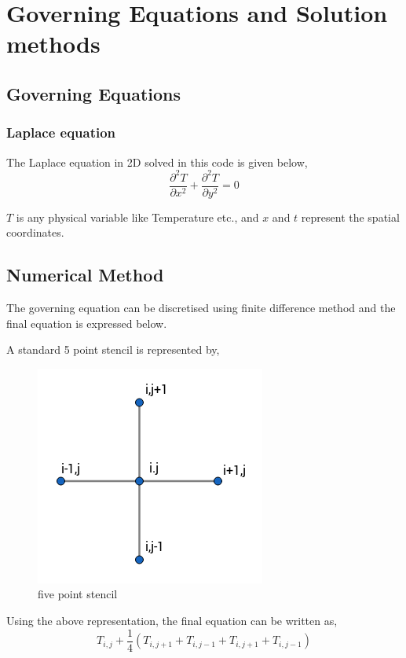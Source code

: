 
\chapter{Governing Equations and Solution methods}

\section{Governing Equations}
\subsection{Laplace equation}The Laplace equation in 2D solved in this code is given below,
\begin{equation}\label{eq:uhe}
 \frac{\partial^2 T}{\partial x^2}+\frac{\partial^2 T}{\partial y^2} = 0
\end{equation}

$T$ is any physical variable like Temperature etc., and $x$ and $t$ represent the spatial coordinates.







\section{Numerical Method}
\hspace{0.25cm}The governing equation can be discretised using finite difference method and the final equation is expressed below. 

A standard 5 point stencil is represented by, 
\begin{figure}[H]
\centering
\includegraphics[scale=0.4]{figures/stencil.png}
\caption{five point stencil}
\label{fig:rline}
\end{figure}
Using the above representation, the final equation can be written as,
\begin{equation}
         T_{i,j}+\frac{1}{4}(T_{i,j+1}+T_{i,j-1}+T_{i,j+1}+T_{i,j-1}) 
\end{equation}


    


